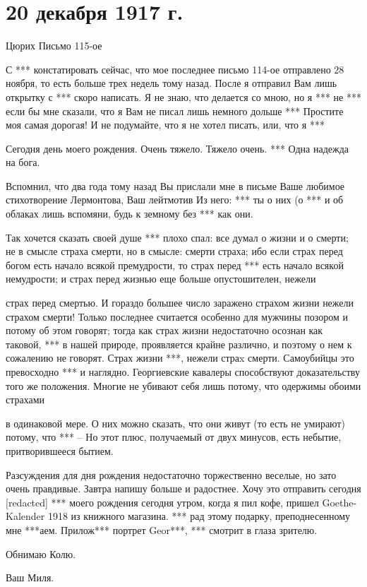 \section{20 декабря 1917 г.}


Цюрих
Письмо 115-ое

С *** констатировать
сейчас, что мое последнее письмо 114-ое отправлено 28 ноября, то есть больше
трех недель тому назад. После я отправил Вам лишь открытку с *** скоро написать.
Я не знаю, что делается со мною, но я *** не *** если бы мне сказали, что
я Вам не писал лишь немного дольше ***
Простите моя самая дорогая!
И не подумайте, что я не хотел писать, или, что я ***

Сегодня день моего рождения. Очень тяжело. Тяжело очень. ***
Одна надежда на бога.


Вспомнил, что два года тому
назад Вы прислали мне
в письме Ваше любимое
стихотворение Лермонтова,
Ваш лейтмотив\textellipsis{} Из
него: *** ты о них (о *** и об облаках лишь вспомяни, будь к
земному без ***
как они.

Так хочется сказать своей душе\textellipsis{}
*** плохо спал: все думал о жизни
и о\textellipsis{} смерти; не в смысле
страха смерти, но в смысле:
смерти страха; ибо если
страх перед богом есть
начало всякой премудрости,
то страх перед ***
есть начало
всякой немудрости; и страх
перед жизнью еще больше
опустошителен, нежели


\noindent
страх перед смертью.
И гораздо большее число
заражено страхом жизни
нежели страхом смерти!
Только последнее считается
особенно для мужчины позором
и потому об этом
говорят; тогда как страх
жизни недостаточно осознан
как таковой, ***
в нашей природе,
проявляется крайне
различно, и поэтому о нем
к сожалению не говорят.
Страх жизни ***,
нежели страx смерти.
Самоубийцы это превосходно
*** и наглядно.
Георгиевские кавалеры
способствуют доказательству
того же положения.
Многие не убивают
себя лишь потому, что
одержимы обоими страхами



\noindent
в одинаковой мере.
О них можно сказать,
что они живут
(то есть не умирают) потому,
что *** -- Но этот
плюс, получаемый от двух
минусов, есть небытие,
притворившееся бытием.

Разсуждения для дня рождения
недостаточно торжественно
веселые, но зато очень правдивые.
Завтра напишу больше
и радостнее. Хочу это
отправить сегодня
[redacted] *** моего рождения
сегодня утром, когда я пил кофе,
пришел Goethe-Kalender 1918
из книжного магазина. ***
рад этому подарку, преподнесенному
мне ***аем.
Прилож*** портрет Geor***,
*** смотрит в глаза
зрителю.

Обнимаю Колю.

Ваш Миля.
